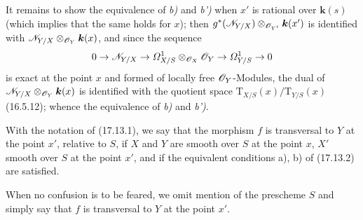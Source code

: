 It remains to show the equivalence of \emph{b)} and \emph{b')} when $x'$ is rational over $\boldsymbol{k}(s)$ (which implies that the same holds for $x$); then $g^*(\mathscr{N}_{Y/X})\otimes_{\mathscr{O}_{Y'}}\boldsymbol{k}(x')$ is identified with $\mathscr{N}_{Y/X}\otimes_{\mathscr{O}_Y}\boldsymbol{k}(x)$, and since the sequence
\[
0\to\mathscr{N}_{Y/X}\to\varOmega^1_{X/S}\otimes_{\mathscr{O}_X}\mathscr{O}_Y\to\varOmega^1_{Y/S}\to0
\]
is exact at the point $x$ and formed of locally free $\mathscr{O}_Y$-Modules, the dual of $\mathscr{N}_{Y/X}\otimes_{\mathscr{O}_Y}\boldsymbol{k}(x)$ is identified with the quotient space $\mathrm{T}_{X/S}(x)/\mathrm{T}_{Y/S}(x)$ (16.5.12); whence the equivalence of \emph{b)} and \emph{b')}.

\begin{definition}[17.13.3]\label{IV.17.13.3}
With the notation of \textup{(17.13.1)}, we say that the morphism $f$ is transversal to $Y$ at the point $x'$, relative to $S$, if $X$ and $Y$ are smooth over $S$ at the point $x$, $X'$ smooth over $S$ at the point $x'$, and if the equivalent conditions \textup{a), b)} of \textup{(17.13.2)} are satisfied.
\end{definition}

When no confusion is to be feared, we omit mention of the prescheme $S$ and simply say that $f$ is transversal to $Y$ at the point $x'$.

